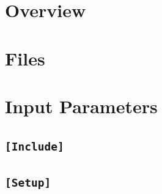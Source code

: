 

\newcommand{\ifprivate}{\iffalse}    %



%
\sloppy\raggedbottom
\newenvironment{keydescription}[1]{
                \vspace{1.5\baselineskip} \begin{minipage}{\textwidth}
                   {\large\bf #1} \vspace{\baselineskip} \\ }{
                \end{minipage}}
\newenvironment{keytab}{
                \vspace{.5\baselineskip} \begin{tabbing} 
                   ~~ \= Default:~ \=  \+  \kill}{
                \end{tabbing}}
\renewcommand{\mathrm}[1]{{\rm #1}}
%
\pagestyle{headings}
%


%
%
%

%
%
\begin{titlepage}

\end{titlepage}
%
%
\tableofcontents
\thispagestyle{empty}
%
\chapter{Overview}
%
%
%
\chapter{Files}
%

%
\chapter{Input Parameters}
%

%
\newpage
\section{\texttt{[Include]} ~}

%
\newpage
\section{\texttt{[Setup]} ~}

%
\newpage
